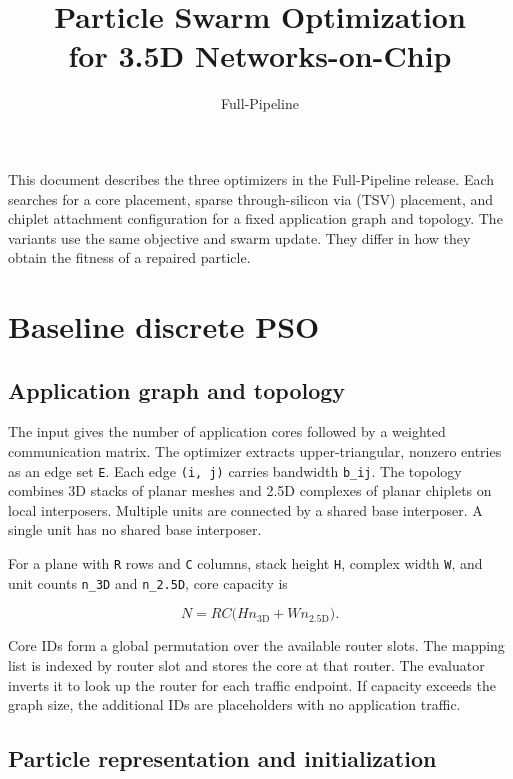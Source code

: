\documentclass[11pt,a4paper]{article}
\title{\sffamily\bfseries Particle Swarm Optimization\\[3pt] for 3.5D Networks-on-Chip}
\author{\sffamily Full-Pipeline}
\date{}
\begin{document}
\maketitle
\vspace{-1.0em}

This document describes the three optimizers in the Full-Pipeline release. Each searches for a core placement, sparse through-silicon via (TSV) placement, and chiplet attachment configuration for a fixed application graph and topology. The variants use the same objective and swarm update. They differ in how they obtain the fitness of a repaired particle.

\tableofcontents

\section{Baseline discrete PSO}

\subsection{Application graph and topology}

The input gives the number of application cores followed by a weighted communication matrix. The optimizer extracts upper-triangular, nonzero entries as an edge set \texttt{E}. Each edge \texttt{(i, j)} carries bandwidth \texttt{b\_ij}. The topology combines 3D stacks of planar meshes and 2.5D complexes of planar chiplets on local interposers. Multiple units are connected by a shared base interposer. A single unit has no shared base interposer.

For a plane with \texttt{R} rows and \texttt{C} columns, stack height \texttt{H}, complex width \texttt{W}, and unit counts \texttt{n\_3D} and \texttt{n\_2.5D}, core capacity is

\[
N = R C \bigl(H n_{\mathrm{3D}} + W n_{\mathrm{2.5D}}\bigr).
\]

Core IDs form a global permutation over the available router slots. The mapping list is indexed by router slot and stores the core at that router. The evaluator inverts it to look up the router for each traffic endpoint. If capacity exceeds the graph size, the additional IDs are placeholders with no application traffic.

\subsection{Particle representation and initialization}
\end{document}

